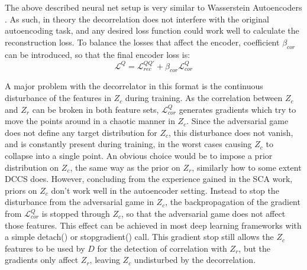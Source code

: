 			The above described neural net setup is very similar to Wasserstein Autoencoders \cite{wae}.
			As such, in theory the decorrelation does not interfere with the original autoencoding task, and any desired loss function could work well to calculate the reconstruction loss.
			To balance the losses that affect the encoder, coefficient $\beta_{cor}$ can be introduced, so that the final encoder loss is:
			\begin{equation}
			\label{eq:l_q}
			\mathcal{L}^Q = \mathcal{L}^{QQ'}_{rec} + \beta_{cor}\mathcal{L}^Q_{cor}
			\end{equation}
			
			A major problem with the decorrelator in this format is the continuous disturbance of the features in $Z_c$ during training.
			As the correlation between $Z_c$ and $Z_r$ can be broken in both feature sets, $\mathcal{L}^Q_{cor}$ generates gradients which try to move the points around in a chaotic manner in $Z_c$.
			Since the adversarial game does not define any target distribution for $Z_c$, this disturbance does not vanish, and is constantly present during training, in the worst cases causing $Z_c$ to collapse into a single point.
			An obvious choice would be to impose a prior distribution on $Z_c$, the same way as the prior on $Z_r$, similarly how to some extent \ac{DCCS} does.
			However, concluding from the experience gained in the \ac{SCA} work, priors on $Z_c$ don't work well in the autoencoder setting.
			Instead to stop the disturbance from the adversarial game in $Z_c$, the backpropagation of the gradient from $\mathcal{L}^Q_{cor}$ is stopped through $Z_c$, so that the adversarial game does not affect those features.
			This effect can be achieved in most deep learning frameworks with a simple detach() or stop\textunderscore gradient() call.
			This gradient stop still allows the $Z_c$ features to be used by $D$ for the detection of correlation with $Z_r$, but the gradients only affect $Z_r$, leaving $Z_c$ undisturbed by the decorrelation.
			

